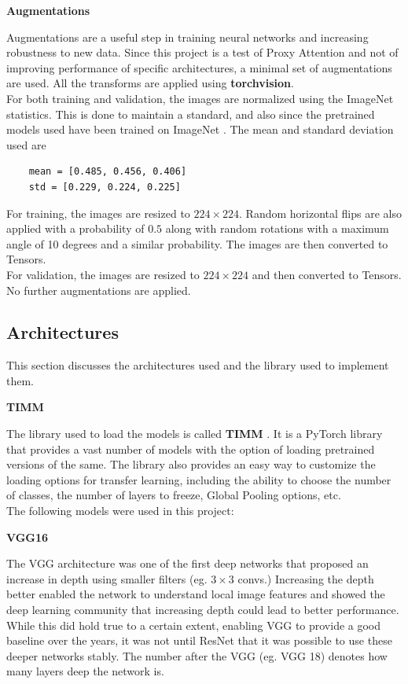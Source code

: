 \documentclass[a4paper,11pt,openright]{book}
\begin{document}
\textbf{Augmentations}

Augmentations are a useful step in training neural networks and increasing robustness to new data. Since this project is a test of Proxy Attention and not of improving performance of specific architectures, a minimal set of augmentations are used. All the transforms are applied using \textbf{torchvision}.\\
For both training and validation, the images are normalized using the ImageNet statistics. This is done to maintain a standard, and also since the pretrained models used have been trained on ImageNet \cite{dengImageNetLargeScaleHierarchical2009}. The mean and standard deviation used are \begin{verbatim}
    mean = [0.485, 0.456, 0.406]
    std = [0.229, 0.224, 0.225]
\end{verbatim}
For training, the images are resized to $224\times224$. Random horizontal flips are also applied with a probability of $0.5$ along with random rotations with a maximum angle of 10 degrees and a similar probability. The images are then converted to Tensors.\\
For validation, the images are resized to $224\times224$ and then converted to Tensors. No further augmentations are applied.\\

\subsection{Architectures}
This section discusses the architectures used and the library used to implement them.

\textbf{TIMM}

The library used to load the models is called \textbf{TIMM} \cite{wightmanRwightmanPytorchimagemodelsV02023}. It is a PyTorch library that provides a vast number of models with the option of loading pretrained versions of the same. The library also provides an easy way to customize the loading options for transfer learning, including the ability to choose the number of classes, the number of layers to freeze, Global Pooling options, etc.\\
The following models were used in this project:

\textbf{VGG16}

The VGG architecture was one of the first deep networks that proposed an increase in depth using smaller filters (eg. $3 \times 3$ convs.) Increasing the depth better enabled the network to understand local image features and showed the deep learning community that increasing depth could lead to better performance. While this did hold true to a certain extent, enabling VGG to provide a good baseline over the years, it was not until ResNet \cite{heDeepResidualLearning2016} that it was possible to use these deeper networks stably. The number after the VGG (eg. VGG 18) denotes how many layers deep the network is.
\end{document}
